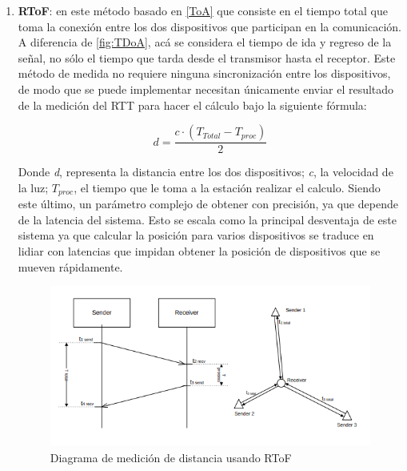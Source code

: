 \begin{itemize}
{\begin{enumerate}
{        }
        \newpage 
        \item {\textbf{\ac{RToF}}: en este método basado en \ref{ToA} que consiste en el tiempo total que toma la conexión entre los dos dispositivos que participan en la comunicación. A diferencia de \ref{fig:TDoA}, acá se considera el tiempo de ida y regreso de la señal, no sólo el tiempo que tarda desde el transmisor hasta el receptor. Este método de medida no requiere ninguna sincronización entre los dispositivos, de modo que se puede implementar necesitan únicamente enviar el resultado de la medición del \ac{RTT} para hacer el cálculo bajo la siguiente fórmula:
        
        \begin{equation}
            d = \dfrac{c\cdot{\left(T_{Total} - T_{proc}\right)}}{2}
        \end{equation}
        
        Donde \textit{d}, representa la distancia entre los dos dispositivos; \textit{c}, la velocidad de la luz; $T_{proc}$, el tiempo que le toma a la estación realizar el calculo. Siendo este último, un parámetro complejo de obtener con precisión, ya que depende de la latencia del sistema. Esto se escala como la principal desventaja de este sistema ya que calcular la posición para varios dispositivos se traduce en lidiar con latencias que impidan obtener la posición de dispositivos que se mueven rápidamente.\\
        
        \begin{figure}[h!]
            \centering
            \includegraphics[scale=0.52]{Tesis/images/rtof}
            \caption{Diagrama de medición de distancia usando \ac{RToF}}
            \label{fig:RTOF}
        \end{figure}
        }
    \end{enumerate}
            }


\end{itemize}
